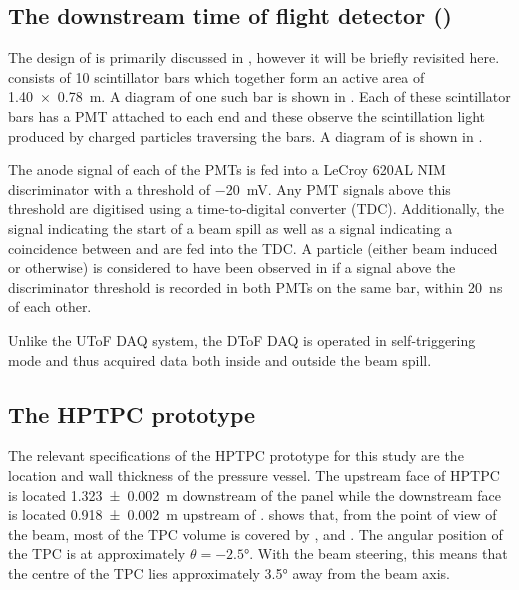 \subsection{The downstream time of flight detector (\SFour)}
\label{sec:hptpc_beam_flux:overview:s4}

The design of \SFour is primarily discussed in , however it will be briefly revisited here.
\SFour consists of 10 scintillator bars which together form an active area of \SI{1.40 x 0.78}{\metre}.
A diagram of one such bar is shown in .
Each of these scintillator bars has a PMT attached to each end and these observe the scintillation light produced by charged particles traversing the bars.
A diagram of \SFour is shown in .

The anode signal of each of the PMTs is fed into a LeCroy 620AL NIM discriminator with a threshold of \SI{-20}{\milli\volt}.
Any PMT signals above this threshold are digitised using a time-to-digital converter (TDC).
Additionally, the signal indicating the start of a beam spill as well as a signal indicating a coincidence between \SOne and \STwo are fed into the TDC.
A particle (either beam induced or otherwise) is considered to have been observed in \SFour if a signal above the discriminator threshold is recorded in both PMTs on the same bar, within \SI{20}{\nano\second} of each other.

Unlike the UToF DAQ system, the DToF DAQ is operated in self-triggering mode and thus acquired data both inside and outside the beam spill.


\subsection{The HPTPC prototype}
\label{sec:hptpc_beam_flux:overview:hptpc}

The relevant specifications of the HPTPC prototype for this study are the location and wall thickness of the pressure vessel.
The upstream face of HPTPC is located \SI{1.323(2)}{\metre} downstream of the \SThree panel while the downstream face is located \SI{0.918(2)}{\metre} upstream of \SFour.
 shows that, from the point of view of the beam, most of the  TPC volume is covered by \STwo, \SThree and \SFour.
The angular position of the TPC is at approximately $\theta = \ang{-2.5}$.
With the beam steering, this means that the centre of the TPC lies approximately \ang{3.5} away from the beam axis.

